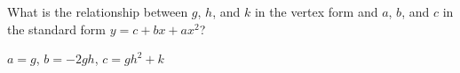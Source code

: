 What is the relationship between $g$, $h$, and $k$ in the vertex form and $a$, $b$, and $c$ in the standard form $y = c + bx + ax^2$?

\begin{solution}
    $a=g$, $b=-2gh$, $c=gh^2+k$
\end{solution}